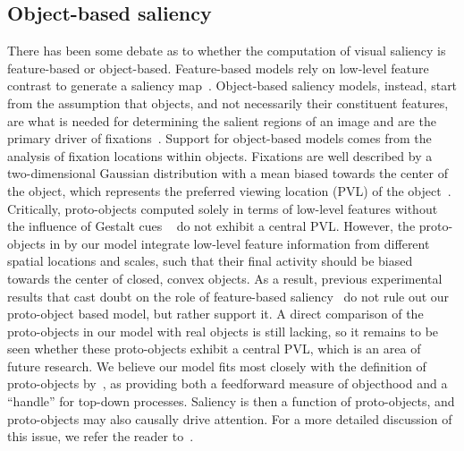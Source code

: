 \subsection{Object-based saliency}

There has been some debate as to whether the computation of visual saliency is feature-based or object-based. Feature-based models rely on low-level feature contrast to generate a saliency map~\citep[\eg][]{Itti_etal98a,Walther_Koch06}. Object-based saliency models, instead, start from the assumption that objects, and not necessarily their constituent features, are what is needed for determining the salient regions of an image and are the primary driver of fixations~\citep{Einhauser_etal08a,Nuthman_Henderson10,Stoll_etal15}.
%
%
Support for object-based models comes from the analysis of fixation locations within objects. Fixations are well described by a two-dimensional Gaussian distribution with a mean biased towards the center of the object, which represents the preferred viewing location (PVL) of the object~\citep{Nuthman_Henderson10}. Critically, proto-objects computed solely in terms of low-level features without the influence of Gestalt cues ~\citep{Walther_Koch06} do not exhibit a central PVL. However, the proto-objects in by our model integrate low-level feature information from different spatial locations and scales, such that their final activity should be biased towards the center of closed, convex objects. As a result, previous experimental results that cast doubt on the role of feature-based saliency~\citep{Einhauser_etal08a,Nuthman_Henderson10,Stoll_etal15} do not rule out our proto-object based model, but rather support it. A direct comparison of the proto-objects in our model with real objects is still lacking, so it remains to be seen whether these proto-objects exhibit a central PVL, which is an area of future research. We believe our model fits most closely with the definition of proto-objects by~\cite{Rensink00a}, as providing both a feedforward measure of objecthood and a ``handle'' for top-down processes. Saliency is then a function of proto-objects, and proto-objects may also causally drive attention. For a more detailed discussion of this issue, we refer the reader to~\citet{Russell_etal14}.

